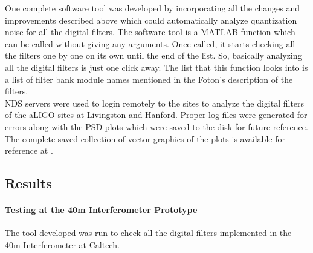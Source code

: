 \documentclass[colorlinks=true,pdfstartview=FitV,linkcolor=blue,
            citecolor=red,urlcolor=magenta]{ligodoc}
\begin{document}
	One complete software tool was developed by incorporating all the changes and improvements described above which could automatically analyze quantization noise for all the digital filters. The software tool is a MATLAB function which can be called without giving any arguments. Once called, it starts checking all the filters one by one on its own until the end of the list. So, basically analyzing all the digital filters is just one click away. The list that this function looks into is a list of filter bank module names mentioned in the Foton's description of the filters. \\
	NDS servers were used to login remotely to the sites to analyze the digital filters of the aLIGO sites at Livingston and Hanford. Proper log files were generated for errors along with the PSD plots which were saved to the disk for future reference. The complete saved collection of vector graphics of the plots is available for reference at \cite{Collection}.  \\
	
	\subsection{Results}
		\paragraph{Testing at the 40m Interferometer Prototype}
	The tool developed was run to check all the digital filters implemented in the 40m Interferometer at Caltech.
\end{document}

